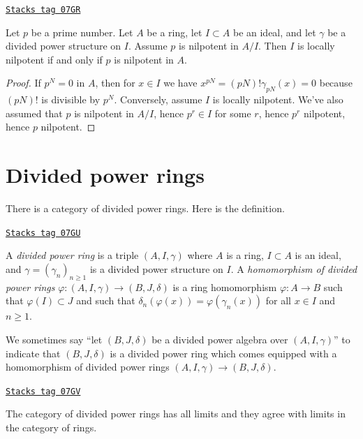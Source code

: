 \begin{lemma}[Nil]
\label{dpa-lemma-nil}
\href{https://stacks.math.columbia.edu/tag/07GR}{\texttt{Stacks tag 07GR}}

Let $p$ be a prime number. Let $A$ be a ring, let $I \subset A$ be an ideal,
and let $\gamma$ be a divided power structure on $I$. Assume $p$ is nilpotent
in $A/I$. Then $I$ is locally nilpotent if and only if $p$ is nilpotent in $A$.
\end{lemma}

\begin{proof}
If $p^N = 0$ in $A$, then for $x \in I$ we have
$x^{pN} = (pN)!\gamma_{pN}(x) = 0$ because $(pN)!$ is
divisible by $p^N$. Conversely, assume $I$ is locally nilpotent.
We've also assumed that $p$ is nilpotent in $A/I$, hence
$p^r \in I$ for some $r$, hence $p^r$ nilpotent, hence $p$ nilpotent.
\end{proof}

\section{Divided power rings}
\label{dpa-section-divided-power-rings}
There is a category of divided power rings.
Here is the definition.

\begin{definition}
\label{dpa-definition-divided-power-ring}
\href{https://stacks.math.columbia.edu/tag/07GU}{\texttt{Stacks tag 07GU}}

A {\it divided power ring} is a triple $(A, I, \gamma)$ where
$A$ is a ring, $I \subset A$ is an ideal, and $\gamma = (\gamma_n)_{n \geq 1}$
is a divided power structure on $I$.
A {\it homomorphism of divided power rings}
$\varphi : (A, I, \gamma) \to (B, J, \delta)$ is a ring homomorphism
$\varphi : A \to B$ such that $\varphi(I) \subset J$ and such that
$\delta_n(\varphi(x)) = \varphi(\gamma_n(x))$ for all $x \in I$ and
$n \geq 1$.
\end{definition}

We sometimes say ``let $(B, J, \delta)$ be a divided power algebra over
$(A, I, \gamma)$'' to indicate that $(B, J, \delta)$ is a divided power ring
which comes equipped with a homomorphism of divided power rings
$(A, I, \gamma) \to (B, J, \delta)$.

\begin{lemma}[Limits]
\label{dpa-lemma-limits}
\href{https://stacks.math.columbia.edu/tag/07GV}{\texttt{Stacks tag 07GV}}

The category of divided power rings has all limits and they agree with
limits in the category of rings.
\end{lemma}

